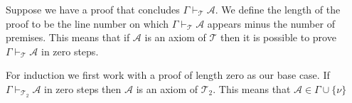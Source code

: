 \documentclass[12pt]{article}
\newcommand{\mc}[1]{\mathcal{#1}}
\begin{document}
Suppose we have a proof that concludes $\Gamma \vdash_{\mc{T}} \mc{A}$. 
We define the length of the proof to be the line number on which $\Gamma \vdash_{\mc{T}} \mc{A}$ appears minus the number of premises.
This means that if $\mc{A}$ is an axiom of $\mc{T}$ then it is possible to prove $\Gamma \vdash_{\mc{T}} \mc{A}$ in zero steps.

For induction we first work with a proof of length zero as our base case.
If $\Gamma \vdash_{\mc{T}_2} \mc{A}$ in zero steps then $\mc{A}$ is an axiom of $\mc{T}_2$.
This means that $\mc{A} \in \Gamma \cup \{\nu\}$
\end{document}

